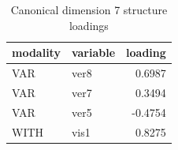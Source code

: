 \begin{table}
\caption{Canonical dimension 7 structure loadings}
\label{tab:cca_dimension_7_loadings}
\begin{tabular}{llr}
\toprule
modality & variable & loading \\
\midrule
VAR & ver8 & 0.6987 \\
VAR & ver7 & 0.3494 \\
VAR & ver5 & -0.4754 \\
WITH & vis1 & 0.8275 \\
\bottomrule
\end{tabular}
\end{table}

